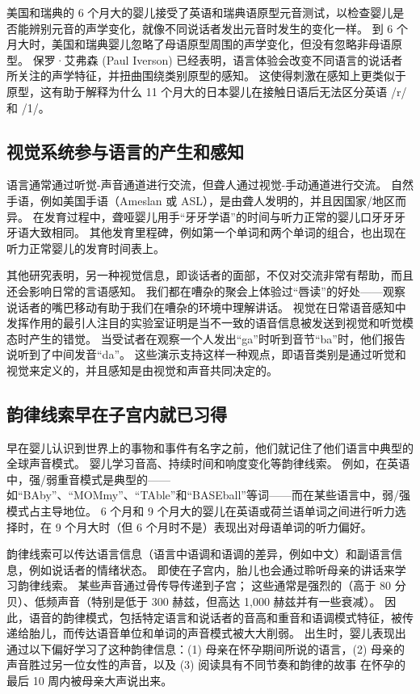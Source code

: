 美国和瑞典的 6 个月大的婴儿接受了英语和瑞典语原型元音测试，以检查婴儿是否能辨别元音的声学变化，就像不同说话者发出元音时发生的变化一样。 到 6 个月大时，美国和瑞典婴儿忽略了母语原型周围的声学变化，但没有忽略非母语原型。 保罗·艾弗森 (Paul Iverson) 已经表明，语言体验会改变不同语言的说话者所关注的声学特征，并扭曲围绕类别原型的感知。 这使得刺激在感知上更类似于原型，这有助于解释为什么 11 个月大的日本婴儿在接触日语后无法区分英语 /r/ 和 /1/。

\subsection{视觉系统参与语言的产生和感知}
语言通常通过听觉-声音通道进行交流，但聋人通过视觉-手动通道进行交流。 自然手语，例如美国手语（Ameslan 或 ASL），是由聋人发明的，并且因国家/地区而异。 在发育过程中，聋哑婴儿用手“牙牙学语”的时间与听力正常的婴儿口牙牙牙牙语大致相同。 其他发育里程碑，例如第一个单词和两个单词的组合，也出现在听力正常婴儿的发育时间表上。

其他研究表明，另一种视觉信息，即谈话者的面部，不仅对交流非常有帮助，而且还会影响日常的言语感知。 我们都在嘈杂的聚会上体验过“唇读”的好处——观察说话者的嘴巴移动有助于我们在嘈杂的环境中理解讲话。 视觉在日常语音感知中发挥作用的最引人注目的实验室证明是当不一致的语音信息被发送到视觉和听觉模态时产生的错觉。 当受试者在观察一个人发出“ga”时听到音节“ba”时，他们报告说听到了中间发音“da”。 这些演示支持这样一种观点，即语音类别是通过听觉和视觉来定义的，并且感知是由视觉和声音共同决定的。

\subsection{韵律线索早在子宫内就已习得}
早在婴儿认识到世界上的事物和事件有名字之前，他们就记住了他们语言中典型的全球声音模式。 婴儿学习音高、持续时间和响度变化等韵律线索。 例如，在英语中，强/弱重音模式是典型的——如“BAby”、“MOMmy”、“TAble”和“BASEball”等词——而在某些语言中，弱/强模式占主导地位。 6 个月和 9 个月大的婴儿在英语或荷兰语单词之间进行听力选择时，在 9 个月大时（但 6 个月时不是）表现出对母语单词的听力偏好。

韵律线索可以传达语言信息（语言中语调和语调的差异，例如中文）和副语言信息，例如说话者的情绪状态。 即使在子宫内，胎儿也会通过聆听母亲的讲话来学习韵律线索。 某些声音通过骨传导传递到子宫； 这些通常是强烈的（高于 80 分贝）、低频声音（特别是低于 300 赫兹，但高达 1,000 赫兹并有一些衰减）。 因此，语音的韵律模式，包括特定语言和说话者的音高和重音和语调模式特征，被传递给胎儿，而传达语音单位和单词的声音模式被大大削弱。 出生时，婴儿表现出通过以下偏好学习了这种韵律信息：(1) 母亲在怀孕期间所说的语言，(2) 母亲的声音胜过另一位女性的声音，以及 (3) 阅读具有不同节奏和韵律的故事 在怀孕的最后 10 周内被母亲大声说出来。

